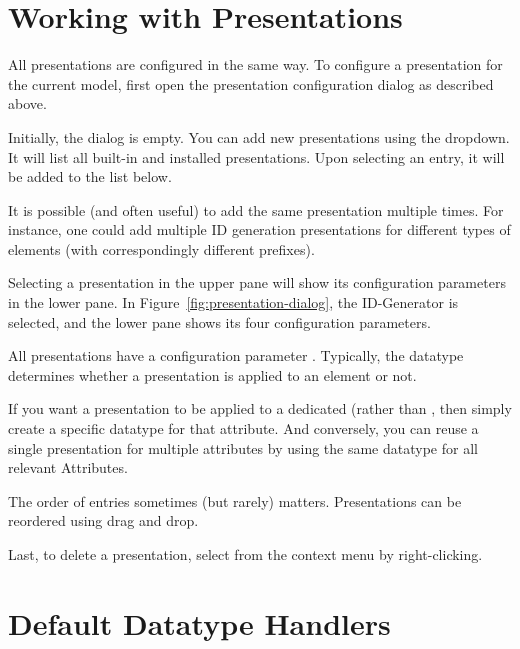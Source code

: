 \section{Working with Presentations}

All presentations are configured in the same way.  To configure a presentation for the current model, first open the presentation configuration dialog as described above.

Initially, the dialog is empty.  You can add new presentations using the  dropdown.  It will list all built-in and installed presentations.  Upon selecting an entry, it will be added to the list below.

\begin{info}It is possible (and often useful) to add the same presentation multiple times. For instance, one could add multiple ID generation presentations for different types of elements (with correspondingly different prefixes). 
\end{info}

Selecting a presentation in the upper pane will show its configuration parameters in the lower pane.  In Figure~\ref{fig:presentation-dialog}, the ID-Generator is selected, and the lower pane shows its four configuration parameters.

All presentations have a configuration parameter .  Typically, the datatype determines whether a presentation is applied to an element or not.

\begin{info}
  If you want a presentation to be applied to a dedicated  (rather than , then simply create a specific datatype for that attribute. And conversely, you can reuse a single presentation for multiple attributes by using the same datatype for all relevant Attributes.
\end{info}

The order of entries sometimes (but rarely) matters.  Presentations can be reordered using drag and drop.

Last, to delete a presentation, select  from the context menu by right-clicking.

\section{Default Datatype Handlers}

